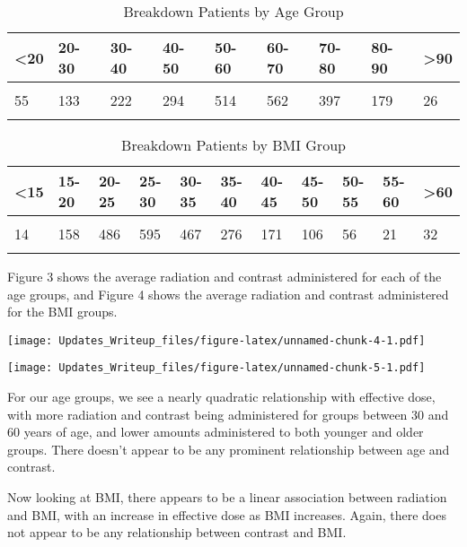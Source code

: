 \documentclass[]{article}
\begin{document}
\begin{table}[H] \centering 
  \caption{Breakdown Patients by Age Group} 
\begin{tabular}{p{1cm}p{1cm}p{1cm}p{1cm}p{1cm}p{1cm}p{1cm}p{1cm}p{1cm}}
\\[-1.8ex] \hline 
\hline
 <20 & 20-30 & 30-40 & 40-50& 50-60 & 60-70 & 70-80 & 80-90 & >90 \\ 
 \hline \\[-1.8ex] 
55 & 133 & 222 & 294 & 514 & 562 & 397 & 179 & 26 \\
\hline 
\hline \\[-1.8ex]
 \end{tabular}
\end{table}

\begin{table}[H] \centering 
  \caption{Breakdown Patients by BMI Group} 
\begin{tabular}{p{1cm}p{1cm}p{1cm}p{1cm}p{1cm}p{1cm}p{1cm}p{1cm}p{1cm}p{1cm}p{1cm}}
\\[-1.8ex] \hline 
\hline
 <15 & 15-20 & 20-25 & 25-30 & 30-35 & 35-40 & 40-45 & 45-50 & 50-55 & 55-60 & >60 \\ 
 \hline \\[-1.8ex] 
14 & 158 & 486 & 595 & 467 & 276 & 171 & 106 & 56 & 21 & 32 \\
\hline 
\hline \\[-1.8ex]
 \end{tabular}
\end{table}

Figure 3 shows the average radiation and contrast administered for each
of the age groups, and Figure 4 shows the average radiation and contrast
administered for the BMI groups.

\texttt{[image: Updates\_Writeup\_files/figure-latex/unnamed-chunk-4-1.pdf]}

\texttt{[image: Updates\_Writeup\_files/figure-latex/unnamed-chunk-5-1.pdf]}

For our age groups, we see a nearly quadratic relationship with
effective dose, with more radiation and contrast being administered for
groups between 30 and 60 years of age, and lower amounts administered to
both younger and older groups. There doesn't appear to be any prominent
relationship between age and contrast.

Now looking at BMI, there appears to be a linear association between
radiation and BMI, with an increase in effective dose as BMI increases.
Again, there does not appear to be any relationship between contrast and
BMI.
\end{document}
